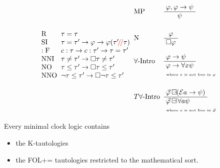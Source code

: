 \documentclass[xcolor=x11names]{beamer}
\newcommand{\bemph}[1] {{\color{DeepSkyBlue3}{#1}}}
\newcommand{\cemph}[1]{\textcolor{red}{#1}}
\newcommand{\lrule}[3][c]{\begin{array}{#1} #2  \\  \hline #3 \end{array}}
\newcommand{\lthen}{\rightarrow}
\newcommand{\BoxTemplate}[1]{{#1} \mathop{\Box\hspace{-1.35ex} \raisebox{.5ex}{\scalebox{.5}{$\lthen$}}}}
\newenvironment{tomb}[2][.1]{\arraycolsep=#1cm\begin{array}{#2}}{\end{array}}
\begin{document}
\begin{frame}
\[\begin{tomb}[.1]{ll}
\\      \mathrm{R}  & \tau=\tau
\\      \mathrm{SI} & \tau=\tau' \lthen \varphi \lthen \varphi (\tau'\cemph{\!/\!/} \tau )
\\      \mathrm{:F} & c: \tau \lthen c:\tau' \lthen \tau=\tau'
\\      \mathrm{NNI}  & \tau\neq\tau' \lthen \Box \tau\neq\tau'
\\      \mathrm{NO}  & \tau\leq\tau' \lthen \Box \tau\leq\tau'
\\      \mathrm{NNO}  & \lnot \tau\leq\tau' \lthen \Box \lnot \tau\leq\tau'
\end{tomb}
\begin{tomb}[.1]{ll}

\\[1em]\mathrm{MP} &  \lrule[c]{\varphi , \varphi \lthen \psi}{\psi}
\\[2em] \mathrm{N}  & \lrule[c]{\varphi}{\Box \varphi}
\\[1.5em] \forall\textup{-Intro}  & \lrule[l]{\varphi \lthen \psi}{\varphi \lthen \forall x \psi }
\\ &\hfill \textup{ \tiny where $x$ is not free in $\varphi$}
\\[1.5em] T\forall\textup{-Intro}  & \lrule[l]{ \BoxTemplate{\vec\varphi } (\mathcal E a\lthen \psi)}{\BoxTemplate{\vec\varphi }\forall a \psi }
\\ &\hfill \textup{ \tiny where $x$ is not free in $\vec \varphi$}
\end{tomb}\]
{\scriptsize Every minimal clock logic contains
\begin{itemize} \scriptsize
\item the K-tautologies
\item the FOL+= tautologies restricted to the mathematical sort.
\end{itemize}}
\end{frame}
\end{document}
